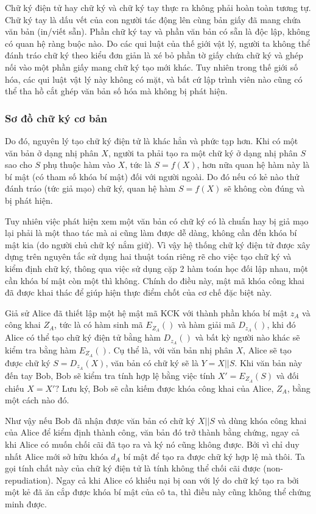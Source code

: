 \documentclass[a4paper,12pt]{report}
\begin{document}
Chữ ký điện tử hay chữ ký và chữ ký tay thực ra không phải hoàn toàn tương tự. Chữ ký tay là dấu vết của con người tác động lên cùng bản giấy đã mang chứa văn bản (in/viết sẵn). Phần chữ ký tay và phần văn bản có sẵn là độc lập, không có quan hệ ràng buộc nào. Do các qui luật của thế giới vật lý, người ta không thể đánh tráo chữ ký theo kiểu đơn giản là xé bỏ phần tờ giấy chứa chữ ký và ghép nối vào một phần giấy mang chữ ký tạo mới khác. Tuy nhiên trong thế giới số hóa, các qui luật vật lý này không có mặt, và bất cứ lập trình viên nào cũng có thể tha hồ cắt ghép văn bản số hóa mà không bị phát hiện. 
\subsubsection{Sơ đồ chữ ký cơ bản}
Do đó, nguyên lý tạo chữ ký điện tử là khác hẳn và phức tạp hơn. Khi có một văn bản ở dạng nhị phân $X$, người ta phải tạo ra một chữ ký ở dạng nhị phân $S$ sao cho $S$ phụ thuộc hàm vào $X$, tức là $S = f(X)$, hơn nữa quan hệ hàm này là bí mật (có tham số khóa bí mật) đối với người ngoài. Do đó nếu có kẻ nào thử đánh tráo (tức giả mạo) chữ ký, quan hệ hàm $S = f(X)$ sẽ không còn đúng và bị phát hiện.

Tuy nhiên việc phát hiện xem một văn bản có chữ ký có là chuẩn hay bị giả mạo lại phải là một thao tác mà ai cũng làm được dễ dàng, không cần đến khóa bí mật kia (do người chủ chữ ký nắm giữ). Vì vậy hệ thống chữ ký điện tử được xây dựng trên nguyên tắc sử dụng hai thuật toán riêng rẽ cho việc tạo chữ ký và kiểm định chữ ký, thông qua việc sử dụng cặp 2 hàm toán học đối lập nhau, một cần khóa bí mật còn một thì không. Chính do điều này, mật mã khóa công khai đã được khai thác để giúp hiện thực điểm chốt của cơ chế đặc biệt này.

Giả sử Alice đã thiết lập một hệ mật mã KCK với thành phần khóa bí mật $z_A$ và công khai $Z_A$, tức là có hàm sinh mã $E_{Z_A}()$ và hàm giải mã $D_{z_A}()$, khi đó Alice có thể tạo chữ ký điện tử bằng hàm $D_{z_A}()$ và bất kỳ người nào khác sẽ kiểm tra bằng hàm $E_{Z_A}()$. Cụ thể là, với văn bản nhị phân $X$, Alice sẽ tạo được chữ ký $S= D_{z_A}(X)$, văn bản có chữ ký sẽ là $Y=X||S$. Khi văn bản này đến tay Bob, Bob sẽ kiểm tra tính hợp lệ bằng việc tính $X'= E_{Z_A}(S)$ và đối chiếu $X = X'?$ Lưu ký, Bob sẽ cần kiếm được khóa công khai của Alice, $Z_A$, bằng một cách nào đó.

Như vậy nếu Bob đã nhận được văn bản có chữ ký $X||S$ và dùng khóa công khai của Alice để kiểm định thành công, văn bản đó trở thành bằng chứng, ngay cả khi Alice có muốn chối cãi đã tạo ra và ký nó cũng không được. Bởi vì chỉ duy nhất Alice mới sở hữu khóa $d_A$ bí mật để tạo ra được chữ ký hợp lệ mà thôi. Ta gọi tính chất này của chữ ký điện tử là tính không thể chối cãi được (non-repudiation). Ngay cả khi Alice có khiếu nại bị oan với lý do chữ ký tạo ra bởi một kẻ đã ăn cắp được khóa bí mật của cô ta, thì điều này cũng không thể chứng minh được.
\end{document}
